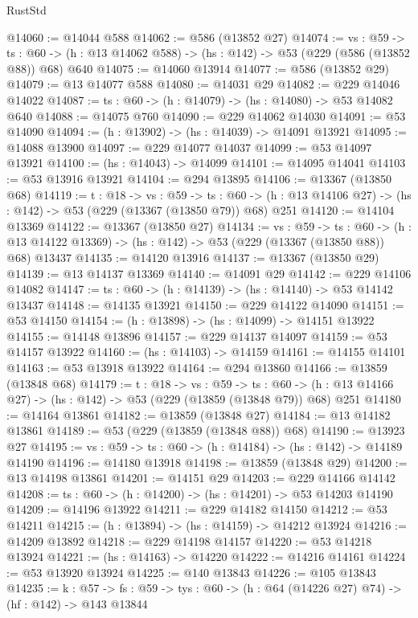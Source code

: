 \begin{lexlean}{RustStd}
\begin{coremodule}
@14060 := @14044 @588
@14062 := @586 (@13852 @27)
@14074 := {vs : @59} ->
  {ts : @60} -> (h : @13 @14062 @588) -> (hs : @142) -> @53 (@229 (@586 (@13852 @88)) @68) @640
@14075 := @14060 @13914
@14077 := @586 (@13852 @29)
@14079 := @13 @14077 @588
@14080 := @14031 @29
@14082 := @229 @14046 @14022
@14087 := {ts : @60} -> (h : @14079) -> (hs : @14080) -> @53 @14082 @640
@14088 := @14075 @760
@14090 := @229 @14062 @14030
@14091 := @53 @14090
@14094 := (h : @13902) -> (hs : @14039) -> @14091 @13921
@14095 := @14088 @13900
@14097 := @229 @14077 @14037
@14099 := @53 @14097 @13921
@14100 := (hs : @14043) -> @14099
@14101 := @14095 @14041
@14103 := @53 @13916 @13921
@14104 := @294 @13895
@14106 := @13367 (@13850 @68)
@14119 := {t : @18} ->
  {vs : @59} ->
  {ts : @60} -> (h : @13 @14106 @27) -> (hs : @142) -> @53 (@229 (@13367 (@13850 @79)) @68) @251
@14120 := @14104 @13369
@14122 := @13367 (@13850 @27)
@14134 := {vs : @59} ->
  {ts : @60} ->
  (h : @13 @14122 @13369) -> (hs : @142) -> @53 (@229 (@13367 (@13850 @88)) @68) @13437
@14135 := @14120 @13916
@14137 := @13367 (@13850 @29)
@14139 := @13 @14137 @13369
@14140 := @14091 @29
@14142 := @229 @14106 @14082
@14147 := {ts : @60} -> (h : @14139) -> (hs : @14140) -> @53 @14142 @13437
@14148 := @14135 @13921
@14150 := @229 @14122 @14090
@14151 := @53 @14150
@14154 := (h : @13898) -> (hs : @14099) -> @14151 @13922
@14155 := @14148 @13896
@14157 := @229 @14137 @14097
@14159 := @53 @14157 @13922
@14160 := (hs : @14103) -> @14159
@14161 := @14155 @14101
@14163 := @53 @13918 @13922
@14164 := @294 @13860
@14166 := @13859 (@13848 @68)
@14179 := {t : @18} ->
  {vs : @59} ->
  {ts : @60} -> (h : @13 @14166 @27) -> (hs : @142) -> @53 (@229 (@13859 (@13848 @79)) @68) @251
@14180 := @14164 @13861
@14182 := @13859 (@13848 @27)
@14184 := @13 @14182 @13861
@14189 := @53 (@229 (@13859 (@13848 @88)) @68)
@14190 := @13923 @27
@14195 := {vs : @59} -> {ts : @60} -> (h : @14184) -> (hs : @142) -> @14189 @14190
@14196 := @14180 @13918
@14198 := @13859 (@13848 @29)
@14200 := @13 @14198 @13861
@14201 := @14151 @29
@14203 := @229 @14166 @14142
@14208 := {ts : @60} -> (h : @14200) -> (hs : @14201) -> @53 @14203 @14190
@14209 := @14196 @13922
@14211 := @229 @14182 @14150
@14212 := @53 @14211
@14215 := (h : @13894) -> (hs : @14159) -> @14212 @13924
@14216 := @14209 @13892
@14218 := @229 @14198 @14157
@14220 := @53 @14218 @13924
@14221 := (hs : @14163) -> @14220
@14222 := @14216 @14161
@14224 := @53 @13920 @13924
@14225 := @140 @13843
@14226 := @105 @13843
@14235 := {k : @57} ->
  {fs : @59} -> {tys : @60} -> (h : @64 (@14226 @27) @74) -> (hf : @142) -> @143 @13844

\end{coremodule}
\end{lexlean}
